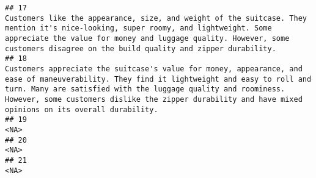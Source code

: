 \documentclass[
]{article}
\begin{document}
\begin{verbatim}
## 17                                                                                                                                                                                                                                                                                                                                                       Customers like the appearance, size, and weight of the suitcase. They mention it's nice-looking, super roomy, and lightweight. Some appreciate the value for money and luggage quality. However, some customers disagree on the build quality and zipper durability.
## 18                                                                                                                                                                                                                                                                                                      Customers appreciate the suitcase's value for money, appearance, and ease of maneuverability. They find it lightweight and easy to roll and turn. Many are satisfied with the luggage quality and roominess. However, some customers dislike the zipper durability and have mixed opinions on its overall durability.
## 19                                                                                                                                                                                                                                                                                                                                                                                                                                                                                                                                                                                                                       <NA>
## 20                                                                                                                                                                                                                                                                                                                                                                                                                                                                                                                                                                                                                       <NA>
## 21                                                                                                                                                                                                                                                                                                                                                                                                                                                                                                                                                                                                                       <NA>

\end{verbatim}
\end{document}
